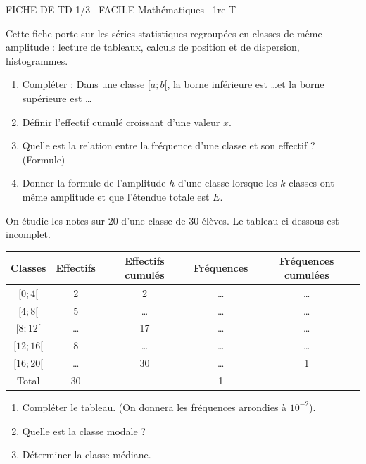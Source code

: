 \documentclass[11pt]{article}
\begin{document}
\begin{tcolorbox}[enhanced,colback=popink,colframe=popink,arc=10pt,boxrule=0pt,left=12pt,right=12pt,top=9pt,bottom=9pt]
{\color{white}\popxbold\small FICHE DE TD 1/3 \textbullet\ FACILE \hfill Mathématiques \textbullet\ 1re T\par}
\end{tcolorbox}
\vspace{4pt}
Cette fiche porte sur les séries statistiques regroupées en classes de même amplitude : lecture de tableaux, calculs de position et de dispersion, histogrammes.

\begin{exercice}
\begin{enumerate}
    \item Compléter : Dans une classe $[a ; b[$, la borne inférieure est \ldots et la borne supérieure est \ldots
    \item Définir l'effectif cumulé croissant d'une valeur $x$.
    \item Quelle est la relation entre la fréquence d'une classe et son effectif ? (Formule)
    \item Donner la formule de l'amplitude $h$ d'une classe lorsque les $k$ classes ont même amplitude et que l'étendue totale est $E$.
\end{enumerate}
\end{exercice}

\begin{exercice}
On étudie les notes sur 20 d'une classe de 30 élèves. Le tableau ci-dessous est incomplet.
\begin{center}
\begin{tabular}{|c|c|c|c|c|}
\hline
Classes & Effectifs & Effectifs cumulés & Fréquences & Fréquences cumulées \\
\hline
$[0 ; 4[$ & 2 & 2 & \ldots & \ldots \\
$[4 ; 8[$ & 5 & \ldots & \ldots & \ldots \\
$[8 ; 12[$ & \ldots & 17 & \ldots & \ldots \\
$[12 ; 16[$ & 8 & \ldots & \ldots & \ldots \\
$[16 ; 20[$ & \ldots & 30 & \ldots & 1 \\
\hline
Total & 30 & & 1 & \\
\hline
\end{tabular}
\end{center}
\begin{enumerate}
    \item Compléter le tableau. (On donnera les fréquences arrondies à $10^{-2}$).
    \item Quelle est la classe modale ?
    \item Déterminer la classe médiane.
\end{enumerate}
\end{exercice}
\end{document}
